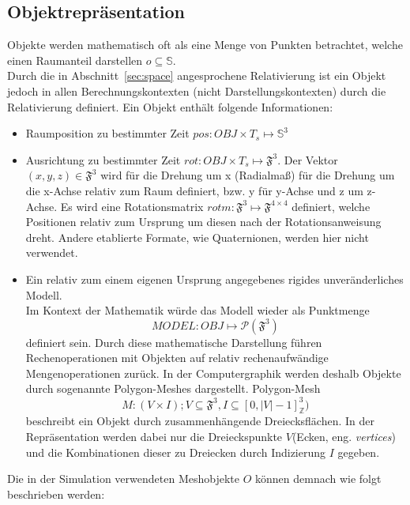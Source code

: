 \subsection{Objektrepräsentation}
\label{sec:objects_rep}
Objekte werden mathematisch oft als eine Menge von Punkten betrachtet, welche einen Raumanteil darstellen $ o \subseteq \mathbb{S}$.\\
Durch die in Abschnitt~\ref{sec:space} angesprochene Relativierung ist ein Objekt jedoch in allen Berechnungskontexten (nicht Darstellungskontexten) durch die Relativierung definiert. Ein Objekt enthält folgende Informationen:
\begin{itemize}
\item Raumposition zu bestimmter Zeit $pos : OBJ \times T_s \mapsto \mathbb{S}^3$
\item Ausrichtung zu bestimmter Zeit $rot : OBJ \times T_s \mapsto \mathfrak{F}^3$. Der Vektor $(x, y, z) \in\mathfrak{F}^3$ wird für die Drehung um x (Radialmaß) für die Drehung um die x-Achse relativ zum Raum definiert, bzw. y für y-Achse und z um z-Achse. Es wird eine Rotationsmatrix $rotm: \mathfrak{F}^3 \mapsto \mathfrak{F}^{4\times 4}$ definiert, welche Positionen relativ zum Ursprung um diesen nach der Rotationsanweisung dreht. Andere etablierte Formate, wie Quaternionen, werden hier nicht verwendet.
\item Ein relativ zum einem eigenen Ursprung angegebenes rigides unveränderliches Modell.\\
\sloppy
Im Kontext der Mathematik würde das Modell wieder als Punktmenge $$ MODEL : OBJ \mapsto \mathcal{P}(\mathfrak{F}^3) $$ definiert sein.
\fussy
Durch diese mathematische Darstellung führen Rechenoperationen mit Objekten auf relativ rechenaufwändige Mengenoperationen zurück. In der Computergraphik werden deshalb Objekte durch sogenannte Polygon-Meshes dargestellt. 
Polygon-Mesh $$M: (V \times I); V \subseteq \mathfrak{F}^3, I \subseteq [0, |V|-1]_\mathbb{Z}^3 )$$ beschreibt ein Objekt durch zusammenhängende Dreiecksflächen. In der Repräsentation werden dabei nur die Dreieckspunkte $V$(Ecken, eng. \textit{vertices}) und die Kombinationen dieser zu Dreiecken durch Indizierung $I$ gegeben.\\

\end{itemize}  
Die in der Simulation verwendeten Meshobjekte $O$ können demnach wie folgt beschrieben werden:
